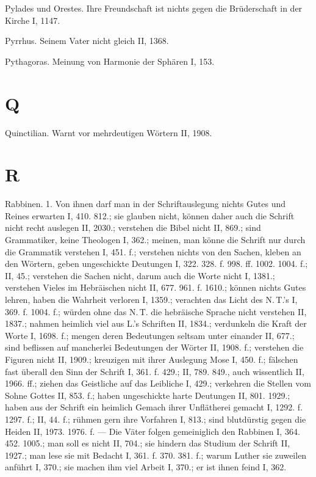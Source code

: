 Pylades und Orestes. Ihre Freundschaft ist nichts gegen die Brüderschaft in der Kirche I, 1147.

Pyrrhus. Seinem Vater nicht gleich II, 1368.

Pythagoras. Meinung von Harmonie der Sphären I, 153.

\section{Q}

Quinctilian. Warnt vor mehrdeutigen Wörtern II, 1908.

\section{R}

Rabbinen. 1.  Von ihnen darf man in der Schriftauslegung nichts Gutes und Reines erwarten I, 410. 812.; sie glauben nicht, können daher auch die Schrift nicht recht auslegen II, 2030.; verstehen die Bibel nicht II, 869.; sind Grammatiker, keine Theologen I, 362.; meinen, man könne die Schrift nur durch die Grammatik verstehen I, 451. f.; verstehen nichts von den Sachen, kleben an den Wörtern, geben ungeschickte Deutungen I, 322. 328. f. 998. ff. 1002. 1004. f.; II, 45.; verstehen die Sachen nicht, darum auch die Worte nicht I, 1381.; verstehen Vieles im Hebräischen nicht II, 677. 961. f. 1610.; können nichts Gutes lehren, haben die Wahrheit verloren I, 1359.; verachten das Licht des N.\,T.’s I, 369. f. 1004. f.; würden ohne das N.\,T. die hebräische Sprache nicht verstehen II, 1837.; nahmen heimlich viel aus L.’s Schriften II, 1834.; verdunkeln die Kraft der Worte I, 1698. f.; mengen deren Bedeutungen seltsam unter einander II, 677.; sind beflissen auf mancherlei Bedeutungen der Wörter II, 1908. f.; verstehen die Figuren nicht II, 1909.; kreuzigen mit ihrer Auslegung Mose I, 450. f.; fälschen fast überall den Sinn der Schrift I, 361. f. 429.; II, 789. 849., auch wissentlich II, 1966. ff.; ziehen das Geistliche auf das Leibliche I, 429.; verkehren die Stellen vom Sohne Gottes II, 853. f.; haben ungeschickte harte Deutungen II, 801. 1929.; haben aus der Schrift ein heimlich Gemach ihrer Unflätherei gemacht I, 1292. f. 1297. f.; II, 44. f.; rühmen gern ihre Vorfahren I, 813.; sind blutdürstig gegen die Heiden II, 1973. 1976. f. — Die Väter folgen gemeiniglich den Rabbinen I, 364. 452. 1005.; man soll es nicht II, 704.; sie hindern das Studium der Schrift II, 1927.; man lese sie mit Bedacht I, 361. f. 370. 381. f.; warum Luther sie zuweilen anführt I, 370.; sie machen ihm viel Arbeit I, 370.; er ist ihnen feind I, 362.

